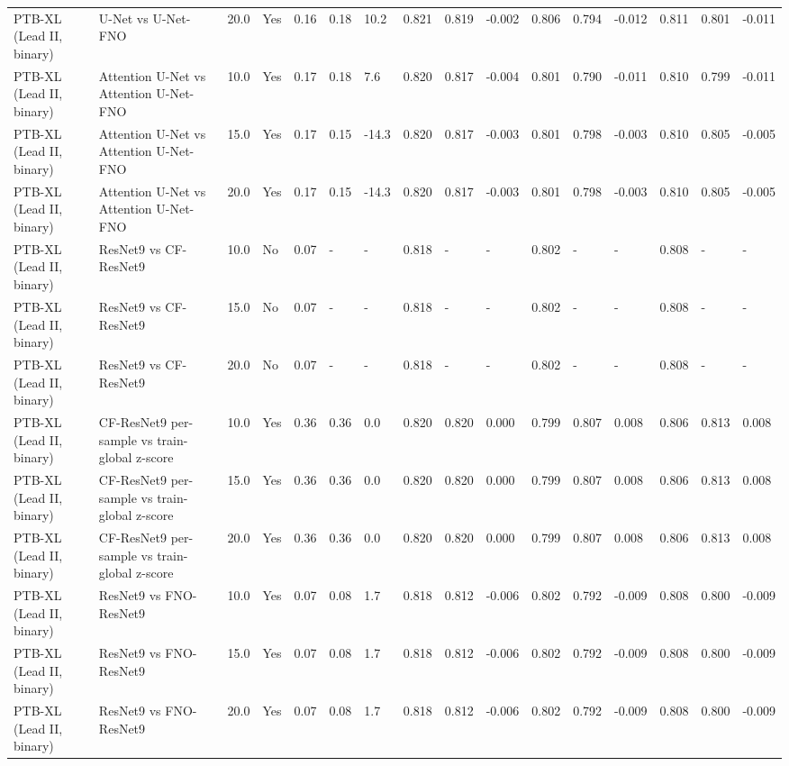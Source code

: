 \begin{longtable}{llllllllllllllll}
PTB-XL (Lead II, binary) & U-Net vs U-Net-FNO & 20.0 & Yes & 0.16 & 0.18 & 10.2 & 0.821 & 0.819 & -0.002 & 0.806 & 0.794 & -0.012 & 0.811 & 0.801 & -0.011 \\
PTB-XL (Lead II, binary) & Attention U-Net vs Attention U-Net-FNO & 10.0 & Yes & 0.17 & 0.18 & 7.6 & 0.820 & 0.817 & -0.004 & 0.801 & 0.790 & -0.011 & 0.810 & 0.799 & -0.011 \\
PTB-XL (Lead II, binary) & Attention U-Net vs Attention U-Net-FNO & 15.0 & Yes & 0.17 & 0.15 & -14.3 & 0.820 & 0.817 & -0.003 & 0.801 & 0.798 & -0.003 & 0.810 & 0.805 & -0.005 \\
PTB-XL (Lead II, binary) & Attention U-Net vs Attention U-Net-FNO & 20.0 & Yes & 0.17 & 0.15 & -14.3 & 0.820 & 0.817 & -0.003 & 0.801 & 0.798 & -0.003 & 0.810 & 0.805 & -0.005 \\
PTB-XL (Lead II, binary) & ResNet9 vs CF-ResNet9 & 10.0 & No & 0.07 & - & - & 0.818 & - & - & 0.802 & - & - & 0.808 & - & - \\
PTB-XL (Lead II, binary) & ResNet9 vs CF-ResNet9 & 15.0 & No & 0.07 & - & - & 0.818 & - & - & 0.802 & - & - & 0.808 & - & - \\
PTB-XL (Lead II, binary) & ResNet9 vs CF-ResNet9 & 20.0 & No & 0.07 & - & - & 0.818 & - & - & 0.802 & - & - & 0.808 & - & - \\
PTB-XL (Lead II, binary) & CF-ResNet9 per-sample vs train-global z-score & 10.0 & Yes & 0.36 & 0.36 & 0.0 & 0.820 & 0.820 & 0.000 & 0.799 & 0.807 & 0.008 & 0.806 & 0.813 & 0.008 \\
PTB-XL (Lead II, binary) & CF-ResNet9 per-sample vs train-global z-score & 15.0 & Yes & 0.36 & 0.36 & 0.0 & 0.820 & 0.820 & 0.000 & 0.799 & 0.807 & 0.008 & 0.806 & 0.813 & 0.008 \\
PTB-XL (Lead II, binary) & CF-ResNet9 per-sample vs train-global z-score & 20.0 & Yes & 0.36 & 0.36 & 0.0 & 0.820 & 0.820 & 0.000 & 0.799 & 0.807 & 0.008 & 0.806 & 0.813 & 0.008 \\
PTB-XL (Lead II, binary) & ResNet9 vs FNO-ResNet9 & 10.0 & Yes & 0.07 & 0.08 & 1.7 & 0.818 & 0.812 & -0.006 & 0.802 & 0.792 & -0.009 & 0.808 & 0.800 & -0.009 \\
PTB-XL (Lead II, binary) & ResNet9 vs FNO-ResNet9 & 15.0 & Yes & 0.07 & 0.08 & 1.7 & 0.818 & 0.812 & -0.006 & 0.802 & 0.792 & -0.009 & 0.808 & 0.800 & -0.009 \\
PTB-XL (Lead II, binary) & ResNet9 vs FNO-ResNet9 & 20.0 & Yes & 0.07 & 0.08 & 1.7 & 0.818 & 0.812 & -0.006 & 0.802 & 0.792 & -0.009 & 0.808 & 0.800 & -0.009 \\

\end{longtable}
